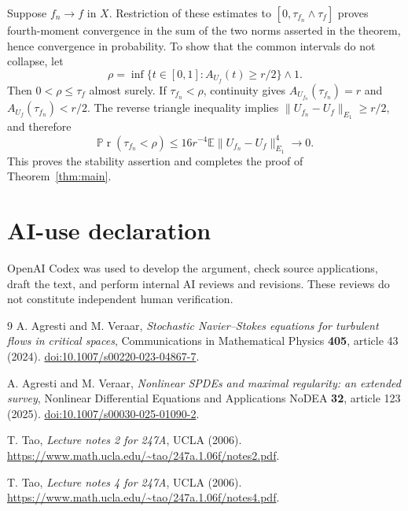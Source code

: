 \documentclass[11pt]{article}
\newcommand{\E}{\mathbb E}
\renewcommand{\Pr}{\mathbb P\!\operatorname{r}}
\numberwithin{equation}{section}
\begin{document}
Suppose $f_n\to f$ in $X$. Restriction of these estimates to
$[0,\tau_{f_n}\wedge\tau_f]$ proves fourth-moment convergence in the sum
of the two norms asserted in the theorem, hence convergence in probability.
To show that the common intervals do not collapse, let
\[
 \rho=\inf\{t\in[0,1]:A_{U_f}(t)\geq r/2\}\wedge1.
\]
Then $0<\rho\leq\tau_f$ almost surely. If $\tau_{f_n}<\rho$, continuity
gives $A_{U_{f_n}}(\tau_{f_n})=r$ and
$A_{U_f}(\tau_{f_n})<r/2$. The reverse triangle inequality implies
$\|U_{f_n}-U_f\|_{E_1}\geq r/2$, and therefore
\[
 \Pr(\tau_{f_n}<\rho)
 \leq16r^{-4}\E\|U_{f_n}-U_f\|_{E_1}^4\longrightarrow0.
\]
This proves the stability assertion and completes the proof of
Theorem~\ref{thm:main}.

\section*{AI-use declaration}
OpenAI Codex was used to develop the argument, check source applications,
draft the text, and perform internal AI reviews and revisions. These reviews
do not constitute independent human verification.

\begin{thebibliography}{9}
A. Agresti and M. Veraar,
\emph{Stochastic Navier--Stokes equations for turbulent flows in critical spaces},
Communications in Mathematical Physics \textbf{405}, article 43 (2024).
\href{https://doi.org/10.1007/s00220-023-04867-7}{doi:10.1007/s00220-023-04867-7}.

A. Agresti and M. Veraar,
\emph{Nonlinear SPDEs and maximal regularity: an extended survey},
Nonlinear Differential Equations and Applications NoDEA \textbf{32},
article 123 (2025).
\href{https://doi.org/10.1007/s00030-025-01090-2}{doi:10.1007/s00030-025-01090-2}.

T. Tao, \emph{Lecture notes 2 for 247A}, UCLA (2006).
\url{https://www.math.ucla.edu/~tao/247a.1.06f/notes2.pdf}.

T. Tao, \emph{Lecture notes 4 for 247A}, UCLA (2006).
\url{https://www.math.ucla.edu/~tao/247a.1.06f/notes4.pdf}.
\end{thebibliography}
\end{document}
